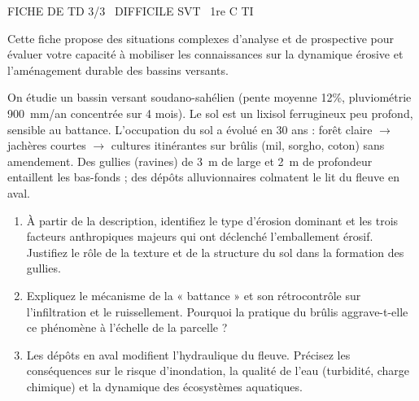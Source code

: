 \documentclass[11pt]{article}
\begin{document}
\begin{tcolorbox}[enhanced,colback=popink,colframe=popink,arc=10pt,boxrule=0pt,left=12pt,right=12pt,top=9pt,bottom=9pt]
{\color{white}\popxbold\small FICHE DE TD 3/3 \textbullet\ DIFFICILE \hfill SVT \textbullet\ 1re C TI\par}
\end{tcolorbox}
\vspace{4pt}
Cette fiche propose des situations complexes d'analyse et de prospective pour évaluer votre capacité à mobiliser les connaissances sur la dynamique érosive et l'aménagement durable des bassins versants.

\begin{exercice}
On étudie un bassin versant soudano-sahélien (pente moyenne 12\%, pluviométrie \SI{900}{mm/an} concentrée sur 4 mois). Le sol est un lixisol ferrugineux peu profond, sensible au battance. L'occupation du sol a évolué en 30 ans : forêt claire $\to$ jachères courtes $\to$ cultures itinérantes sur brûlis (mil, sorgho, coton) sans amendement. Des gullies (ravines) de \SI{3}{m} de large et \SI{2}{m} de profondeur entaillent les bas-fonds ; des dépôts alluvionnaires colmatent le lit du fleuve en aval.

\begin{enumerate}
    \item[2 pts] À partir de la description, identifiez le type d'érosion dominant et les trois facteurs anthropiques majeurs qui ont déclenché l'emballement érosif. Justifiez le rôle de la texture et de la structure du sol dans la formation des gullies.
    \item[2 pts] Expliquez le mécanisme de la « battance » et son rétrocontrôle sur l'infiltration et le ruissellement. Pourquoi la pratique du brûlis aggrave-t-elle ce phénomène à l'échelle de la parcelle ?
    \item[2 pts] Les dépôts en aval modifient l'hydraulique du fleuve. Précisez les conséquences sur le risque d'inondation, la qualité de l'eau (turbidité, charge chimique) et la dynamique des écosystèmes aquatiques.
\end{enumerate}
\end{exercice}
\end{document}
